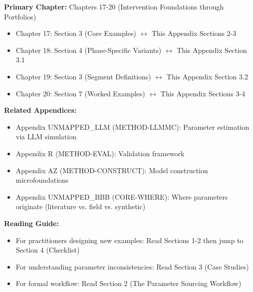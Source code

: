 %
%


\begin{tcolorbox}[colback=purple!5!white, colframe=purple!75!black,
    title=Chapter Linkage]

\textbf{Primary Chapter:} Chapters 17-20 (Intervention Foundations through Portfolios)
\begin{itemize}[nosep]
\item Chapter 17: Section 3 (Core Examples) $\leftrightarrow$ This Appendix Sections 2-3
\item Chapter 18: Section 4 (Phase-Specific Variants) $\leftrightarrow$ This Appendix Section 3.1
\item Chapter 19: Section 3 (Segment Definitions) $\leftrightarrow$ This Appendix Section 3.2
\item Chapter 20: Section 7 (Worked Examples) $\leftrightarrow$ This Appendix Sections 3-4
\end{itemize}

\textbf{Related Appendices:}
\begin{itemize}[nosep]
\item Appendix UNMAPPED_LLM (METHOD-LLMMC): Parameter estimation via LLM simulation
\item Appendix R (METHOD-EVAL): Validation framework
\item Appendix AZ (METHOD-CONSTRUCT): Model construction microfoundations
\item Appendix UNMAPPED_BBB (CORE-WHERE): Where parameters originate (literature vs. field vs. synthetic)
\end{itemize}

\textbf{Reading Guide:}
\begin{itemize}[nosep]
\item For practitioners designing new examples: Read Sections 1-2 then jump to Section 4 (Checklist)
\item For understanding parameter inconsistencies: Read Section 3 (Case Studies)
\item For formal workflow: Read Section 2 (The Parameter Sourcing Workflow)
\end{itemize}

\end{tcolorbox}




